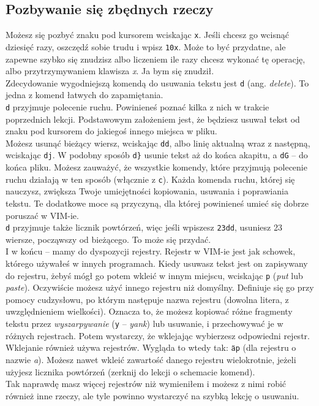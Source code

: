 \documentclass[a4paper,12pt]{article}
\begin{document}
\subsection{Pozbywanie się zbędnych rzeczy}
Możesz się pozbyć znaku pod kursorem wciskając {\tt x}. Jeśli chcesz go wcisnąć dziesięć razy, oszczędź sobie trudu i wpisz {\tt 10x}. Może to być przydatne, ale zapewne szybko się znudzisz albo liczeniem ile razy chcesz wykonać tę operację, albo przytrzymywaniem klawisza {\it x}. Ja bym się znudził.\\
Zdecydowanie wygodniejszą komendą do usuwania tekstu jest {\tt d} (ang. {\it delete}). To jedna z komend łatwych do zapamiętania.\\
{\tt d} przyjmuje polecenie ruchu. Powinieneś poznać kilka z nich w trakcie poprzednich lekcji. Podstawowym założeniem jest, że będziesz usuwał tekst od znaku pod kursorem do jakiegoś innego miejsca w pliku.\\
Możesz usunąć bieżący wiersz, wciskając {\tt dd}, albo linię aktualną wraz z następną, wciskając {\tt dj}. W podobny sposób {\tt d\}} usunie tekst aż do końca akapitu, a {\tt dG} – do końca pliku. Możesz zauważyć, że wszystkie komendy, które przyjmują polecenie ruchu działają w ten sposób (włącznie z {\tt c}). Każda komenda ruchu, której się nauczysz, zwiększa Twoje umiejętności kopiowania, usuwania i poprawiania tekstu. Te dodatkowe moce są przyczyną, dla której powinieneś umieć się dobrze poruszać w VIM-ie.\\
{\tt d} przyjmuje także licznik powtórzeń, więc jeśli wpiszesz {\tt 23dd}, usuniesz 23 wiersze, począwszy od bieżącego. To może się przydać.\\
I w końcu – mamy do dyspozycji rejestry. Rejestr w VIM-ie jest jak schowek, którego używałeś w innych programach. Kiedy usuwasz tekst jest on zapisywany do rejestru, żebyś mógł go potem wkleić w innym miejscu, wciskając {\tt p} ({\it put} lub {\it paste}). Oczywiście możesz użyć innego rejestru niż domyślny. Definiuje się go przy pomocy cudzysłowu, po którym następuje nazwa rejestru (dowolna litera, z uwzględnieniem wielkości). Oznacza to, że możesz kopiować różne fragmenty tekstu przez {\it wyszarpywanie} ({\tt y} – {\it yank}) lub usuwanie, i przechowywać je w różnych rejestrach. Potem wystarczy, że wklejając wybierzesz odpowiedni rejestr.\\
Wklejanie również używa rejestrów. Wygląda to wtedy tak: {\tt \"{}ap} (dla rejestru o nazwie {\it a}). Możesz nawet wkleić zawartość danego rejestru wielokrotnie, jeżeli użyjesz licznika powtórzeń (zerknij do lekcji o schemacie komend).\\
Tak naprawdę masz więcej rejestrów niż wymieniłem i możesz z nimi robić również inne rzeczy, ale tyle powinno wystarczyć na szybką lekcję o usuwaniu.
\end{document}

